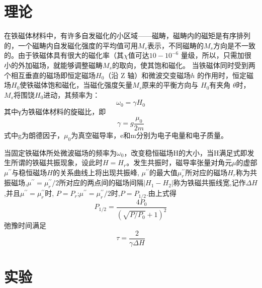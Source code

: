 \documentclass[a4paper]{article}
\begin{document}
\section{理论} \label{theory}%
在铁磁体材料中，有许多自发磁化的小区域——磁畴，磁畴内的磁矩是有序排列的，一个磁畴内自发磁化强度的平均值可用$M_s$表示，不同磁畴的$M_s$方向是不一致的。由于铁磁体具有很大的磁化率（其$\chi$值可达$10-10^{-6}$ 量级，所以，只需加很小的外加磁场，就能够调整磁畴$M_s$的取向，使其饱和磁化。
当铁磁体同时受到两个相互垂直的磁场即恒定磁场$H_0$（沿 Z 轴）和微波交变磁场$h$ 的作用时，恒定磁场$H_0$使铁磁体饱和磁化，当磁化强度矢量$M_s$原来的平衡方向与 $H_0$有夹角
$\theta$时，$M_s$将围饶$H_0$进动，其频率为：
\begin{equation}\label{eq:1}
    \omega_0=\gamma H_0
\end{equation}
其中γ为铁磁体材料的旋磁比，即
\begin{equation}
    \gamma=g\frac{\mu_0}{2m}
\end{equation}
式中g为朗德因子，$\mu_0$为真空磁导率，e和m分别为电子电量和电子质量。

当固定铁磁体所处微波磁场的频率为$\omega_0$，改变稳恒磁场H的大小，当H满足式即发生所谓的铁磁共振现象，设此时$H=H_r$。发生共振时，磁导率张量对角元$\mu$的虚部$\mu^{\prime\prime}$与稳恒磁场$H$的关系曲线上将出现共振峰, $\mu^{\prime\prime}$的最大值$\mu^{\prime\prime}_r$所对应的磁场$H_r$称为共振磁场,$\mu^{\prime\prime}=\mu^{\prime\prime}_r/2$所对应的两点间的磁场间隔$|H_1-H_2|$称为铁磁共振线宽,记作$\Delta H$,并且$\mu^{\prime\prime}=\mu^{\prime\prime}_r$时, $P=P_r$;$\mu^{\prime\prime}=\mu^{\prime\prime}_r/2$时,$P=P_{1/2}$.由上式得
\begin{equation}
    P_{1/2}=\frac{4P_0}{(\sqrt{P/P_0}+1)^2}
\end{equation}
弛豫时间满足
\begin{equation}
    \tau=\frac{2}{\gamma\Delta H}
\end{equation}
	

\newpage
\section{实验} \label{experiment}%
\end{document}
